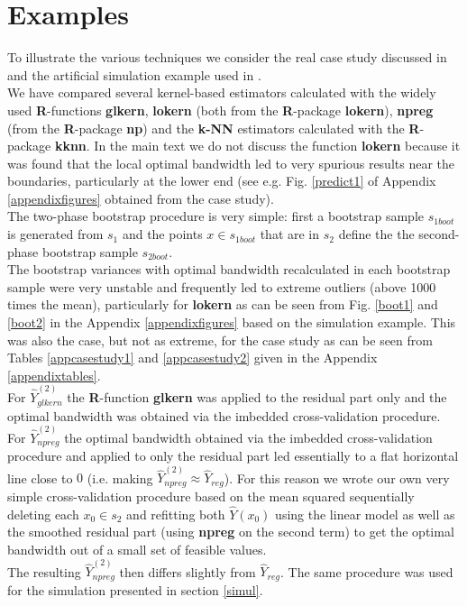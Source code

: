 \documentclass[a4paper,12pt,leqno, titlepage]{article}
\begin{document}
 \section{Examples}\label{simandcasestudy}
To illustrate the various techniques we consider the real case study discussed in \cite{mandallaz4} and the artificial simulation example used in \cite{mandallaz3}.\\
We have compared several kernel-based estimators calculated with the widely used \textbf{R}-functions \textbf{glkern}, \textbf{lokern} (both from the \textbf{R}-package \textbf{lokern}), \textbf{npreg} (from the \textbf{R}-package \textbf{np}) and the \textbf{k-NN} estimators calculated with the \textbf{R}-package \textbf{kknn}. In the main text we do not discuss the function \textbf{lokern} because it was found that the local optimal bandwidth led to very spurious results near the boundaries, particularly at the lower end (see e.g. Fig. \ref{predict1} of Appendix \ref{appendixfigures} obtained from the case study).\\
The two-phase bootstrap procedure is very simple: first a bootstrap sample $s_{1boot}$ is generated from $s_1$ and the points $x\in{s_{1boot}}$ that are in $s_2$ define the the second-phase bootstrap sample $s_{2boot}$.\\
The bootstrap variances with optimal bandwidth recalculated in each bootstrap sample were very unstable and frequently led to extreme outliers (above 1000 times the mean), particularly for \textbf{lokern} as can be seen from Fig. \ref{boot1} and \ref{boot2} in the Appendix \ref{appendixfigures} based on the simulation example. This was also the case, but not as extreme, for the case study as can be seen from Tables \ref{appcasestudy1} and \ref{appcasestudy2} given in the Appendix \ref{appendixtables}. \\
For $\hat{Y}^{(2)}_{glkern}$ the \textbf{R}-function \textbf{glkern} was applied to the residual part only and the optimal bandwidth was obtained via the imbedded cross-validation procedure. For
$\hat{Y}^{(2)}_{npreg}$ the optimal bandwidth obtained via the imbedded cross-validation procedure and applied to only the residual part led essentially to a flat horizontal line close to $0$ (i.e. making $\hat{Y}^{(2)}_{npreg}\approx \hat{Y}_{reg}$). For this reason we wrote our own very simple cross-validation procedure based on the mean squared sequentially deleting each $x_0\in{s_2}$ and refitting both $\hat{Y}(x_0)$ using the linear model as well as the smoothed residual part (using \textbf{npreg} on the second term) to get the optimal bandwidth out of a small set of feasible values. \\ The resulting $\hat{Y}^{(2)}_{npreg}$ then differs slightly from $\hat{Y}_{reg}$. The same procedure was used for the simulation presented in section \ref{simul}.
\end{document}
